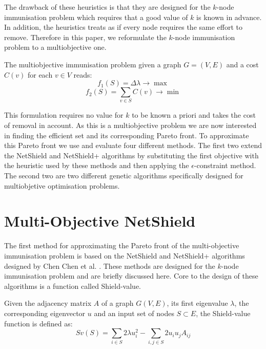 \documentclass{svproc}
\begin{document}
The drawback of these heuristics is that they are designed for the $k$-node immunisation problem which requires that a good value of $k$ is known in advance. In addition, the heuristics treats as if every node requires the same effort to remove. Therefore in this paper, we reformulate the $k$-node immunisation problem to a multiobjective one.

\begin{definition}
The multiobjective immunisation problem given a graph $G=(V,E)$ and a cost $C(v)$ for each $v \in V$ reads:
\begin{equation}
    f_1(S) = \Delta\lambda \rightarrow \max
\end{equation}
\begin{equation}
    f_2(S) = \sum_{v \in S} C(v) \rightarrow \min
\end{equation}
\end{definition}

This formulation requires no value for $k$ to be known a priori and takes the cost of removal in account. As this is a multiobjective problem we are now interested in finding the efficient set and its corresponding Pareto front. To approximate this Pareto front we use and evaluate four different methods. The first two extend the NetShield and NetShield+ algorithms by substituting the first objective with the heuristic used by these methods and then applying the $\epsilon$-constraint method. The second two are two different genetic algorithms specifically designed for multiobjetive optimisation problems.


\section{Multi-Objective NetShield}

The first method for approximating the Pareto front of the multi-objective immunisation problem is based on the NetShield and NetShield+ algorithms designed by Chen Chen et al. \cite{chen2016node}. These methods are designed for the $k$-node immunisation problem and are briefly discussed here. Core to the design of these algorithms is a function called Shield-value.

\begin{definition}
Given the adjacency matrix $A$ of a graph $G(V,E)$, its first eigenvalue $\lambda$, the corresponding eigenvector $u$ and an input set of nodes $S \subset E$, the Shield-value function is defined as:
\begin{equation}
    Sv(S) = \sum_{i \in S} 2 \lambda u_{i}^{2} - \sum_{i,j \in S} 2 u_{i}u_{j}A_{ij}
\end{equation}
\end{definition}
\end{document}
